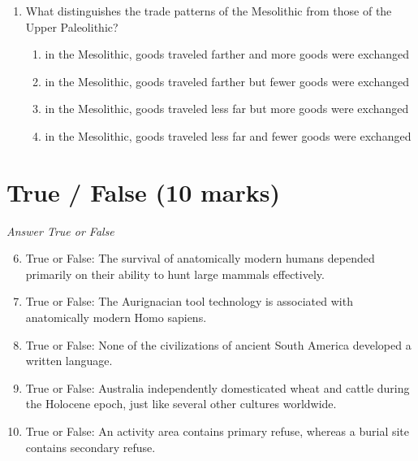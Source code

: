 \documentclass[12pt]{article}
\begin{document}
\begin{enumerate}[label=\arabic*.]
\begin{enumerate}[label=(\alph*)]
    \item scientific creationism; human culture evolved differently than plants and animals
    \item unilineal evolution; civilizations evolved more quickly than plants
    \item natural selection; human culture did not evolve or change much over time
    \item natural selection; human culture had evolved over an enormous period of time
\end{enumerate}
\item What distinguishes the trade patterns of the Mesolithic from those of the Upper Paleolithic?
\begin{enumerate}[label=(\alph*)]
    \item in the Mesolithic, goods traveled farther and more goods were exchanged
    \item in the Mesolithic, goods traveled farther but fewer goods were exchanged
    \item in the Mesolithic, goods traveled less far but more goods were exchanged
    \item in the Mesolithic, goods traveled less far and fewer goods were exchanged
\end{enumerate}
\end{enumerate}

\section*{True / False (10 marks)}
\textit{Answer True or False}
\begin{enumerate}[label=\arabic*.]
\setcounter{enumi}{5}
\item True or False: The survival of anatomically modern humans depended primarily on their ability to hunt large mammals effectively.
\item True or False: The Aurignacian tool technology is associated with anatomically modern Homo sapiens.
\item True or False: None of the civilizations of ancient South America developed a written language.
\item True or False: Australia independently domesticated wheat and cattle during the Holocene epoch, just like several other cultures worldwide.
\item True or False: An activity area contains primary refuse, whereas a burial site contains secondary refuse.
\end{enumerate}
\end{document}

